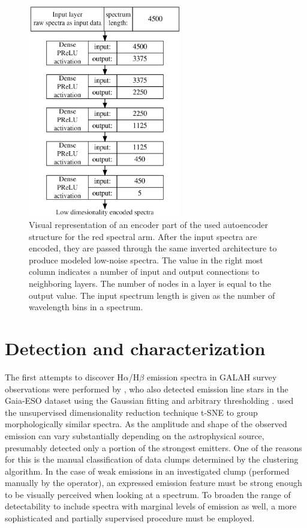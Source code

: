 \begin{figure}
	\centering
	\includegraphics[width=0.6\textwidth]{ann_network_structure_a.png}
	\caption{Visual representation of an encoder part of the used autoencoder structure for the red spectral arm. After the input spectra are encoded, they are passed through the same inverted architecture to produce modeled low-noise spectra. The value in the right most column indicates a number of input and output connections to neighboring layers. The number of nodes in a layer is equal to the output value. The input spectrum length is given as the number of wavelength bins in a spectrum.}
	\label{fig:autoann}
\end{figure}

\section{Detection and characterization}
\label{sec:det_chart}
The first attempts to discover H$\alpha$/H$\beta$ emission spectra in GALAH survey observations were performed by \citet{2017ApJS..228...24T}, who also detected emission line stars in the Gaia-ESO \cite{2012Msngr.147...25G} dataset using the Gaussian fitting and arbitrary thresholding \cite{2015A&A...581A..52T}. \citet{2017ApJS..228...24T} used the unsupervised dimensionality reduction technique t-SNE \cite{2013arXiv1301.3342V} to group morphologically similar spectra. As the amplitude and shape of the observed emission can vary substantially depending on the astrophysical source, \citet{2017ApJS..228...24T} presumably detected only a portion of the strongest emitters. One of the reasons for this is the manual classification of data clumps determined by the clustering algorithm. In the case of weak emissions in an investigated clump (performed manually by the operator), an expressed emission feature must be strong enough to be visually perceived when looking at a spectrum. To broaden the range of detectability to include spectra with marginal levels of emission as well, a more sophisticated and partially supervised procedure must be employed.

